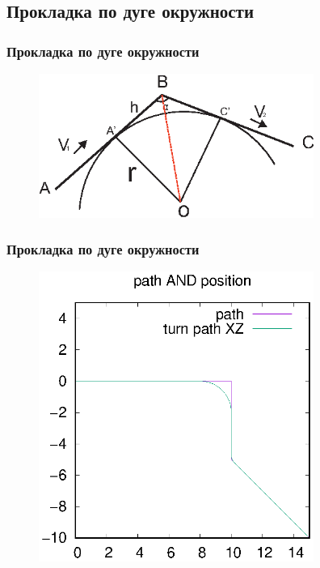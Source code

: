 \documentclass[10pt,t]{beamer}
\begin{document}
\subsection[Прокладка по дуге окружности]{Прокладка по дуге окружности}
\begin{frame}
\frametitle{Прокладка по дуге окружности}
\small
\begin{figure}[h]
\centering
\includegraphics[width=90mm]{tochki_kasania.eps}
\end{figure}

\end{frame}
\begin{frame}
\frametitle{Прокладка по дуге окружности}
\small	
	\begin{figure}
	\centering
		\includegraphics[width=90mm]{default_path_prokladka.eps}

	\end{figure}
\end{frame}
\end{document}
